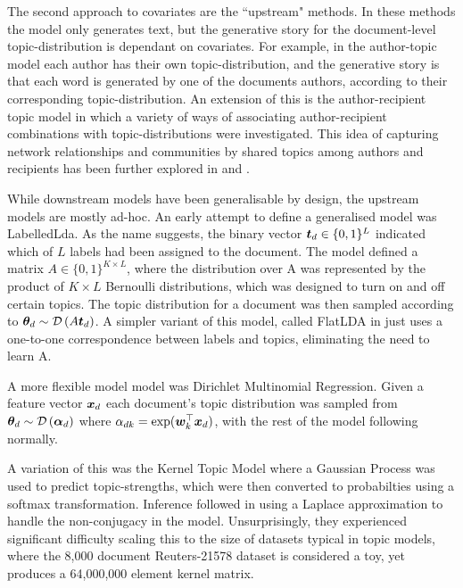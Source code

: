 The second approach to covariates are the ``upstream" methods. In these methods the model only generates text, but the generative story for the document-level topic-distribution is dependant on covariates. For example, in the author-topic model\cite{RosenZvi2004} each author has their own topic-distribution, and the generative story is that each word is generated by one of the documents authors, according to their corresponding topic-distribution. An extension of this is the author-recipient topic model\cite{MacCallum2007} in which a variety of ways of associating author-recipient combinations with topic-distributions were investigated. This idea of capturing network relationships and communities by shared topics among authors and recipients has been further explored in \cite{Sachan2012} and \cite{Kang2013}.

While downstream models have been generalisable by design, the upstream models are mostly ad-hoc. An early attempt to define a generalised model was LabelledLda\cite{Ramage2009}. As the name suggests, the binary vector $\bm t_d \in \{0,1\}^L$ indicated which of $L$ labels had been assigned to the document. The model defined a matrix $A \in \{0,1\}^{K \times L}$, where the distribution over A was represented by the product of $K \times L$ Bernoulli distributions, which was designed to turn on and off certain topics. The topic distribution for a document was then sampled according to ${ \bm \theta_d } \sim \mathcal{D} \left( {A\bm t_d} \right)$. A simpler variant of this model, called FlatLDA in\cite{Rubin2011} just uses a one-to-one correspondence between labels and topics, eliminating the need to learn A.

A more flexible model model was Dirichlet Multinomial Regression\cite{Mimno2008}. Given a feature vector $\bm x_d$ each document's topic distribution was sampled from ${ \bm \theta_d } \sim \mathcal{D} \left( {\bm \alpha_{d}} \right)$ where $\alpha_{dk} = \exp(\bm w_k^\top\bm x_d)$, with the rest of the model following normally.

A variation of this was the Kernel Topic Model\cite{Hennig2012} where a Gaussian Process was used to predict topic-strengths, which were then converted to probabilties using a softmax transformation. Inference followed \cite{WilliamsBarber1998} in using a Laplace approximation to handle the non-conjugacy in the model. Unsurprisingly, they experienced significant difficulty scaling this to the size of datasets typical in topic models, where the 8,000 document Reuters-21578 dataset is considered a toy, yet produces a 64,000,000 element kernel matrix.

